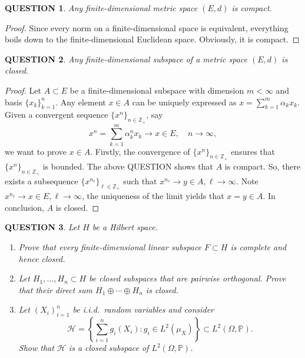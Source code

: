 \documentclass[12pt]{article}
\renewcommand{\(}{\left(}%
\renewcommand{\)}{\right)}%
\renewcommand{\[}{\left[}%
\renewcommand{\]}{\right]}%
\newcommand{\z}{\mathbb{Z}}
\newtheorem{question}{QUESTION}[section]}
\newtheorem{proof}{Proof.}}
\begin{document}
  \begin{question}
  	Any finite-dimensional metric space $(E,d)$ is compact.
  \end{question}
  \begin{proof}
  	Since every norm on a finite-dimensional space is equivalent, everything boils down to the finite-dimensional Euclidean space. Obviously, it is compact.
  \end{proof}
  
  \begin{question}
  	Any finite-dimensional subspace of a metric space $(E,d)$ is closed.
  \end{question}
  \begin{proof}
  	Let $A\subset E$ be a finite-dimensional subspace with dimension $m<\infty$ and basis $\{x_k\}_{k=1}^ n$. Any element $x\in A$ can be uniquely expressed as $x=\sum_{k=1}^m \alpha_kx_k$. Given a convergent sequence $\{x^n\}_{n\in\z_+}$, say
  	\begin{equation*}
  		x^n=\sum_{k=1}^m \alpha_k^nx_k\to x\in E,\quad n\to\infty,
  	\end{equation*}
  	we want to prove $x\in A$. Firstly, the convergence of $\{x^n\}_{n\in\z_+}$ ensures that $\{x^n\}_{n\in\z_+}$ is bounded. The above QUESTION shows that $A$ is compact. So, there exists a subsequence $\{x^{n_\ell}\}_{\ell\in\z_+}$ such that $x^{n_\ell}\to y\in A,\ell\to\infty$. Note $x^{n_\ell}\to x\in E,\ell\to\infty$, the uniqueness of the limit yields that $x=y\in A$. In conclusion, $A$ is closed.
  \end{proof}

  \begin{question}
Let $H$ be a Hilbert space.

\begin{enumerate}
    \item[(a)] Prove that every finite-dimensional linear subspace $F \subset H$ is complete and hence closed.
    
    \item[(b)] Let $H_1,\dots,H_n \subset H$ be closed subspaces that are pairwise orthogonal. Prove that their direct sum
    $
    H_1 \oplus \cdots \oplus H_n
    $
    is closed.
    
    \item[(c)] Let $(X_i)_{i=1}^n$ be i.i.d.\ random variables and consider
    \begin{equation*}
         \mathcal H
    =
    \left\{
    \sum_{i=1}^n g_i(X_i)
    :
    g_i \in L^2(\mu_X)
    \right\}
    \subset L^2(\Omega,\mathbb P).
    \end{equation*}
    Show that $\mathcal H$ is a closed subspace of $L^2(\Omega,\mathbb P)$.
\end{enumerate}
\end{question}
\end{document}
